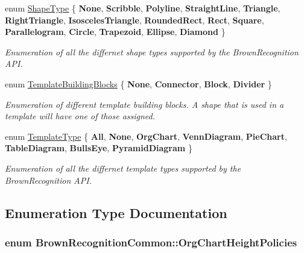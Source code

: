 \begin{DoxyCompactItemize}
enum \hyperlink{namespace_brown_recognition_common_a86340ddb3d90188573ed7b4484046ec3}{\-Shape\-Type} \{ \*
{\bfseries \-None}, 
{\bfseries \-Scribble}, 
{\bfseries \-Polyline}, 
{\bfseries \-Straight\-Line}, 
\*
{\bfseries \-Triangle}, 
{\bfseries \-Right\-Triangle}, 
{\bfseries \-Isosceles\-Triangle}, 
{\bfseries \-Rounded\-Rect}, 
\*
{\bfseries \-Rect}, 
{\bfseries \-Square}, 
{\bfseries \-Parallelogram}, 
{\bfseries \-Circle}, 
\*
{\bfseries \-Trapezoid}, 
{\bfseries \-Ellipse}, 
{\bfseries \-Diamond}
 \}
\begin{DoxyCompactList}\small\item\em \-Enumeration of all the differnet shape types supported by the \-Brown\-Recognition \-A\-P\-I. \end{DoxyCompactList}\item 
enum \hyperlink{namespace_brown_recognition_common_a7392e1ad819495147e6f96b995309138}{\-Template\-Building\-Blocks} \{ {\bfseries \-None}, 
{\bfseries \-Connector}, 
{\bfseries \-Block}, 
{\bfseries \-Divider}
 \}
\begin{DoxyCompactList}\small\item\em \-Enumeration of different template building blocks. \-A shape that is used in a template will have one of those assigned. \end{DoxyCompactList}\item 
enum \hyperlink{namespace_brown_recognition_common_a08ddb81441b8ac27fc140488e6dbb160}{\-Template\-Type} \{ \*
{\bfseries \-All}, 
{\bfseries \-None}, 
{\bfseries \-Org\-Chart}, 
{\bfseries \-Venn\-Diagram}, 
\*
{\bfseries \-Pie\-Chart}, 
{\bfseries \-Table\-Diagram}, 
{\bfseries \-Bulls\-Eye}, 
{\bfseries \-Pyramid\-Diagram}
 \}
\begin{DoxyCompactList}\small\item\em \-Enumeration of all the differnet template types supported by the \-Brown\-Recognition \-A\-P\-I. \end{DoxyCompactList}\end{DoxyCompactItemize}


\subsection{\-Enumeration \-Type \-Documentation}
\hypertarget{namespace_brown_recognition_common_ad4408ca473997d3ec1b071e5f5c4573f}{
\subsubsection[{\-Org\-Chart\-Height\-Policies}]{\setlength{\rightskip}{0pt plus 5cm}enum {\bf \-Brown\-Recognition\-Common\-::\-Org\-Chart\-Height\-Policies}}}
\label{namespace_brown_recognition_common_ad4408ca473997d3ec1b071e5f5c4573f}


